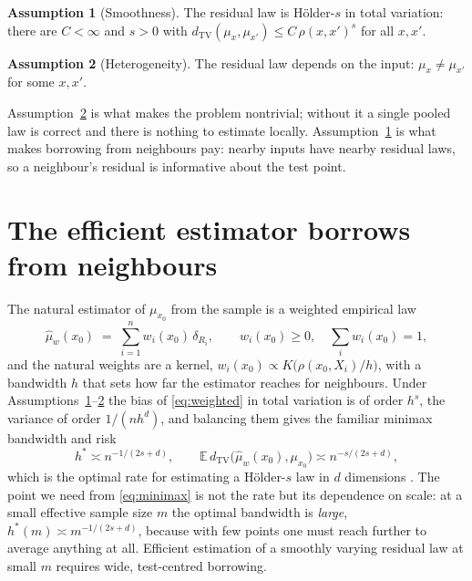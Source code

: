 \documentclass[11pt]{article}
\theoremstyle{definition}
\newtheorem{assumption}{Assumption}
\theoremstyle{remark}
\newcommand{\E}{\mathbb{E}}
\newcommand{\TV}{\mathrm{TV}}
\newcommand{\dtv}{d_{\TV}}
\begin{document}
\begin{assumption}[Smoothness]\label{as:smooth}
The residual law is H\"older-$s$ in total variation: there are $C<\infty$ and $s>0$ with
$\dtv(\mu_x,\mu_{x'}) \le C\,\rho(x,x')^{s}$ for all $x,x'$.
\end{assumption}

\begin{assumption}[Heterogeneity]\label{as:het}
The residual law depends on the input: $\mu_x \ne \mu_{x'}$ for some $x,x'$.
\end{assumption}

Assumption~\ref{as:het} is what makes the problem nontrivial; without it a single
pooled law is correct and there is nothing to estimate locally. Assumption~\ref{as:smooth}
is what makes borrowing from neighbours pay: nearby inputs have nearby residual laws, so
a neighbour's residual is informative about the test point.

\section{The efficient estimator borrows from neighbours}

The natural estimator of $\mu_{x_0}$ from the sample is a weighted empirical law
\begin{equation}\label{eq:weighted}
  \widehat\mu_{w}(x_0) \;=\; \sum_{i=1}^{n} w_i(x_0)\, \delta_{R_i},
  \qquad w_i(x_0) \ge 0, \quad \sum_i w_i(x_0) = 1,
\end{equation}
and the natural weights are a kernel, $w_i(x_0) \propto K\!\big(\rho(x_0,X_i)/h\big)$, with
a bandwidth $h$ that sets how far the estimator reaches for neighbours. Under
Assumptions~\ref{as:smooth}--\ref{as:het} the bias of \eqref{eq:weighted} in total
variation is of order $h^{s}$, the variance of order $1/(n h^{d})$, and balancing them
gives the familiar minimax bandwidth and risk
\begin{equation}\label{eq:minimax}
  h^{*} \asymp n^{-1/(2s+d)},
  \qquad
  \E\,\dtv\big(\widehat\mu_{w}(x_0),\mu_{x_0}\big) \asymp n^{-s/(2s+d)} ,
\end{equation}
which is the optimal rate for estimating a H\"older-$s$ law in $d$ dimensions
\citep{tsybakov2009introduction}. The point we need from \eqref{eq:minimax} is not the
rate but its dependence on scale: at a small effective sample size $m$ the optimal
bandwidth is \emph{large}, $h^{*}(m) \asymp m^{-1/(2s+d)}$, because with few points one
must reach further to average anything at all. Efficient estimation of a smoothly
varying residual law at small $m$ requires wide, test-centred borrowing.
\end{document}
